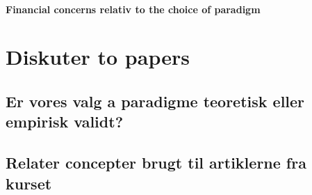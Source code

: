 \documentclass[a4paper]{article}
\begin{document}
\paragraph{Financial concerns relativ to the choice of paradigm}

\section{Diskuter to papers}
\subsection{Er vores valg a paradigme teoretisk eller empirisk validt?}
\subsection{Relater concepter brugt til artiklerne fra kurset}

\printbibliography[heading=bibintoc]
\end{document}
